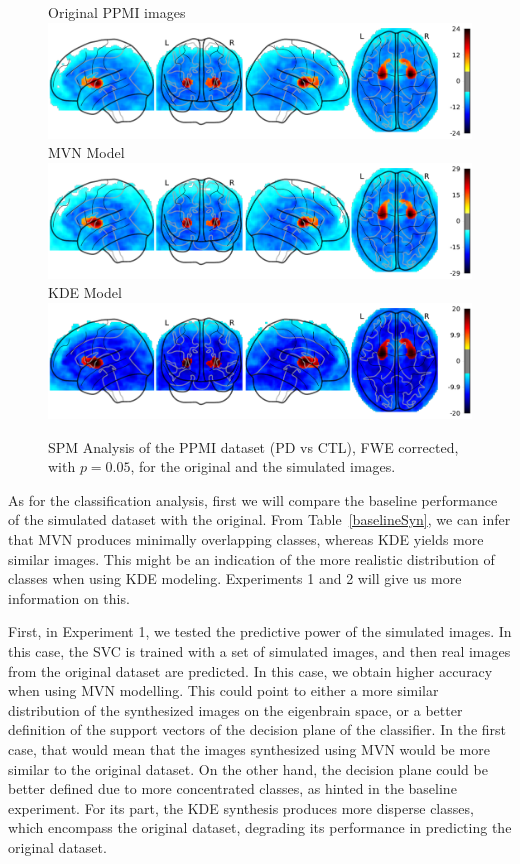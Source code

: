\begin{figure}
	\centering
	Original PPMI images\\
	\includegraphics[width=0.8\linewidth]{Graphics/ch8/NORvsPD_Orig_glass}\\
	\ac{MVN} Model\\
	\includegraphics[width=0.8\linewidth]{Graphics/ch8/NORvsPD_MVN_glass}\\
	\ac{KDE} Model\\
	\includegraphics[width=0.8\linewidth]{Graphics/ch8/NORvsPD_KDE_glass}
	\caption[\acs{SPM} Analysis of the PPMI dataset.]{\ac{SPM} Analysis of the PPMI dataset (\ac{PD} vs \ac{CTL}), \ac{FWE} corrected, with $p=0.05$, for the original and the simulated images.}
	\label{fig:spmPKS}
\end{figure}

As for the classification analysis, first we will compare the baseline performance of the simulated dataset with the original. From Table~\ref{baselineSyn}, we can infer that \ac{MVN} produces minimally overlapping classes, whereas \ac{KDE} yields more similar images. This might be an indication of the more realistic distribution of classes when using \ac{KDE} modeling. Experiments 1 and 2 will give us more information on this.

First, in Experiment 1, we tested the predictive power of the simulated images. In this case, the SVC is trained with a set of simulated images, and then real images from the original dataset are predicted. In this case, we obtain higher accuracy when using \ac{MVN} modelling. This could point to either a more similar distribution of the synthesized images on the eigenbrain space, or a better definition of the support vectors of the decision plane of the classifier. In the first case, that would mean that the images synthesized using \ac{MVN} would be more similar to the original dataset. On the other hand, the decision plane could be better defined due to more concentrated classes, as hinted in the baseline experiment. For its part, the \ac{KDE} synthesis produces more disperse classes, which encompass the original dataset, degrading its performance in predicting the original dataset. 

